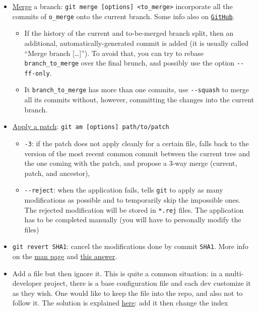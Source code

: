 \documentclass[a4paper,12pt,%
              final%
              ]{article}
\begin{document}
\begin{itemize}
\begin{itemize}
    \end{itemize}
  \item \href{https://git-scm.com/docs/git-merge}{Merge} a branch: \verb|git merge [options] <to_merge>| incorporate all the commits of \verb|o_merge| onto the current branch. Some info also on \href{https://docs.github.com/en/github/collaborating-with-issues-and-pull-requests/about-pull-request-merges}{\texttt{GitHub}}.
    \begin{itemize}
      \item If the history of the current and to-be-merged branch split, then an additional, automatically-generated commit is added (it is usually called ``Merge branch [\ldots]''). To avoid that, you can try to rebase \verb|branch_to_merge| over the final brunch, and possibly use the option \verb|--ff-only|.
      \item It \verb|branch_to_merge| has more than one commits, use \verb|--squash| to merge all its commits without, however, committing the changes into the current branch.
    \end{itemize}
  \item \href{https://git-scm.com/docs/git-am}{Apply a patch}: \verb|git am [options] path/to/patch|
    \begin{itemize}
      \item \texttt{-3}: if the patch does not apply cleanly for a certain file, falls back to the version of the most recent common commit between the current tree and the one coming with the patch, and propose a 3-way merge (current, patch, and ancestor),
      \item \verb|--reject|: when the application fails, tells \texttt{git} to apply as many modifications as possible and to temporarily skip the impossible ones. The rejected modification will be stored in \texttt{*.rej} files. The application has to be completed manually (you will have to personally modify the files)
    \end{itemize}
  \item \texttt{git revert SHA1}: cancel the modifications done by commit \texttt{SHA1}. More info on the \href{https://git-scm.com/docs/git-revert}{man page} and \href{https://stackoverflow.com/a/4114122}{this answer}.
  \item Add a file but then ignore it. This is quite a common situation: in a multi-developer project, there is a base configuration file and each dev customize it as they wish. One would like to keep the file into the repo, and also not to follow it. The solution is explained \href{https://stackoverflow.com/questions/3319479/can-i-git-commit-a-file-and-ignore-its-content-changes}{here}: add it then change the index

\end{itemize}
\end{document}
